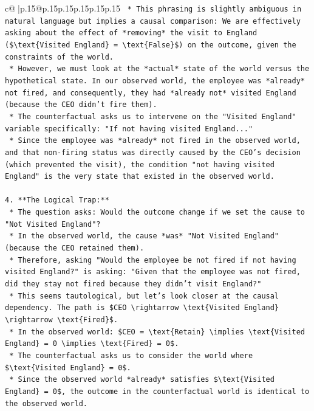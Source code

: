 \documentclass{article}
\begin{document}
{\begin{supertabular}{c@{$\;$}|p{.15\linewidth}@{}p{.15\linewidth}p{.15\linewidth}p{.15\linewidth}p{.15\linewidth}p{.15\linewidth}}
{{{\texttt{    *   This phrasing is slightly ambiguous in natural language but implies a causal comparison: We are effectively asking about the effect of *removing* the visit to England (\$\textbackslash{}text\{Visited England\} = \textbackslash{}text\{False\}\$) on the outcome, given the constraints of the world.} \\
\texttt{    *   However, we must look at the *actual* state of the world versus the hypothetical state. In our observed world, the employee was *already* not fired, and consequently, they had *already not* visited England (because the CEO didn't fire them).} \\
\texttt{    *   The counterfactual asks us to intervene on the "Visited England" variable specifically: "If not having visited England..."} \\
\texttt{    *   Since the employee was *already* not fired in the observed world, and that non{-}firing status was directly caused by the CEO's decision (which prevented the visit), the condition "not having visited England" is the very state that existed in the observed world.} \\
\\ 
\texttt{4.  **The Logical Trap:**} \\
\texttt{    *   The question asks: Would the outcome change if we set the cause to "Not Visited England"?} \\
\texttt{    *   In the observed world, the cause *was* "Not Visited England" (because the CEO retained them).} \\
\texttt{    *   Therefore, asking "Would the employee be not fired if not having visited England?" is asking: "Given that the employee was not fired, did they stay not fired because they didn't visit England?"} \\
\texttt{    *   This seems tautological, but let's look closer at the causal dependency. The path is \$CEO \textbackslash{}rightarrow \textbackslash{}text\{Visited England\} \textbackslash{}rightarrow \textbackslash{}text\{Fired\}\$.} \\
\texttt{    *   In the observed world: \$CEO = \textbackslash{}text\{Retain\} \textbackslash{}implies \textbackslash{}text\{Visited England\} = 0 \textbackslash{}implies \textbackslash{}text\{Fired\} = 0\$.} \\
\texttt{    *   The counterfactual asks us to consider the world where \$\textbackslash{}text\{Visited England\} = 0\$.} \\
\texttt{    *   Since the observed world *already* satisfies \$\textbackslash{}text\{Visited England\} = 0\$, the outcome in the counterfactual world is identical to the observed world.} \\
}}}
\end{supertabular}}
\end{document}
